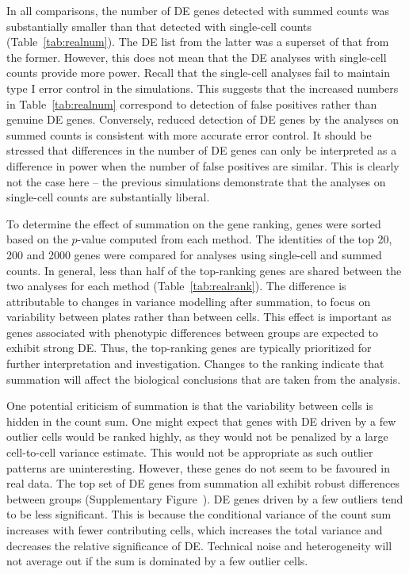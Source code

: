 \documentclass[oupdraft]{bio}
\begin{document}
In all comparisons, the number of DE genes detected with summed counts was substantially smaller than that detected with single-cell counts (Table~\ref{tab:realnum}).
The DE list from the latter was a superset of that from the former.
However, this does not mean that the DE analyses with single-cell counts provide more power.
Recall that the single-cell analyses fail to maintain type I error control in the simulations.
This suggests that the increased numbers in Table~\ref{tab:realnum} correspond to detection of false positives rather than genuine DE genes.
Conversely, reduced detection of DE genes by the analyses on summed counts is consistent with more accurate error control.
It should be stressed that differences in the number of DE genes can only be interpreted as a difference in power when the number of false positives are similar.
This is clearly not the case here -- the previous simulations demonstrate that the analyses on single-cell counts are substantially liberal.

To determine the effect of summation on the gene ranking, genes were sorted based on the $p$-value computed from each method.
The identities of the top 20, 200 and 2000 genes were compared for analyses using single-cell and summed counts.
In general, less than half of the top-ranking genes are shared between the two analyses for each method (Table~\ref{tab:realrank}).
The difference is attributable to changes in variance modelling after summation, to focus on variability between plates rather than between cells.
This effect is important as genes associated with phenotypic differences between groups are expected to exhibit strong DE.
Thus, the top-ranking genes are typically prioritized for further interpretation and investigation.
Changes to the ranking indicate that summation will affect the biological conclusions that are taken from the analysis.

One potential criticism of summation is that the variability between cells is hidden in the count sum.
One might expect that genes with DE driven by a few outlier cells would be ranked highly, as they would not be penalized by a large cell-to-cell variance estimate.
This would not be appropriate as such outlier patterns are uninteresting.
However, these genes do not seem to be favoured in real data.
The top set of DE genes from summation all exhibit robust differences between groups (Supplementary Figure~\suppexpprof{}).
DE genes driven by a few outliers tend to be less significant.
This is because the conditional variance of the count sum increases with fewer contributing cells, 
    which increases the total variance and decreases the relative significance of DE.
Technical noise and heterogeneity will not average out if the sum is dominated by a few outlier cells.
\end{document}
